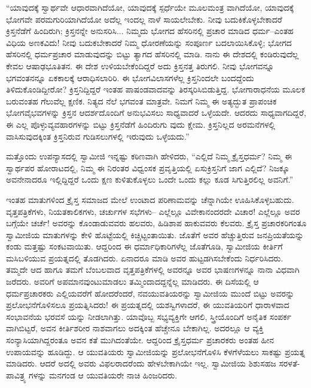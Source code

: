 “ಯಾವುದಕ್ಕೆ ಸ್ವಾರ್ಥವೇ ಆಧಾರವಾಗಿದೆಯೋ, ಯಾವುದಕ್ಕೆ ಸ್ಪರ್ಧೆಯೇ ಮೂಲಮಂತ್ರ ವಾಗಿದೆಯೋ, ಯಾವುದಕ್ಕೆ ಭೋಗವೇ ಪರಮಗುರಿಯಾಗಿದೆಯೋ ಅದೆಲ್ಲ ಇಂದಲ್ಲ ನಾಳೆ ಸಾಯಲೇಬೇಕು. ನೀವು ಬದುಕಿಕೊಳ್ಳಬೇಕಾದರೆ ಕ್ರಿಸ್ತನೆಡೆಗೆ ಹಿಂದಿರುಗಿ; ಕ್ರಿಸ್ತನನ್ನೇ ಅನುಸರಿಸಿ... ನಿಮ್ಮದು ಭೋಗದ ಹೆಸರಿನಲ್ಲಿ ಪ್ರಚಾರ ಮಾಡಿದ ಧರ್ಮ–ಎಂತಹ ವಿಧಿಯ ಅಣಕವಿದು! ನೀವು ಬದುಕಬೇಕಾದರೆ ನಿಮ್ಮ ಧೋರಣೆಯನ್ನು ಸಂಪೂರ್ಣ ಬದಲಾಯಿಸಿಕೊಳ್ಳಿ; ಭೋಗದ ಹೆಸರಿನಲ್ಲಿ ಧರ್ಮಪ್ರಚಾರ ಮಾಡುವುದನ್ನು ಬಿಟ್ಟು ತ್ಯಾಗದ ಹೆಸರಿನಲ್ಲಿ ಮಾಡಿ. ನಾನು ಈ ದೇಶದಲ್ಲಿ ಕಂಡಿರುವುದೆಲ್ಲ ಕೇವಲ ಆಷಾಢಭೂತಿತನ. ಈ ದೇಶ ಉಳಿಯಬೇಕೆಂದಿದ್ದರೆ ಅದು ಕ್ರಿಸ್ತನತ್ತ ತಿರುಗಲಿ. ನೀವು ಭೋಗವನ್ನೂ ಭಗವಂತನನ್ನೂ ಏಕಕಾಲಕ್ಕೆ ಆರಾಧಿಸಲಾರಿರಿ. ಈ ಭೋಗವಿಲಾಸಗಳೆಲ್ಲ ಕ್ರಿಸ್ತನಿಂದಲೇ ಬಂದದ್ದೆಂದು ತಿಳಿದುಕೊಂಡಿದ್ದೀರೋ? ಕ್ರಿಸ್ತನಿದ್ದಿದ್ದರೆ ಇಂತಹ ಪಾಷಂಡವಾದವನ್ನು ತಿರಸ್ಕರಿಸಿಬಿಡುತ್ತಿದ್ದ. ಭೋಗಾರಾಧನೆಯ ಮೂಲಕ ಬರುವಂತಹ ಗೆಲುವೆಲ್ಲ ಕ್ಷಣಿಕ. ನಿತ್ಯದ ನೆಲೆ ಭಗವಂತ ಮಾತ್ರವೇ. ನಿಮಗೆ ನಿಮ್ಮ ಈ ಅತ್ಯದ್ಭುತ ಪ್ರಾಪಂಚಿಕ ಭೋಗವೈಭವಗಳನ್ನು ಕ್ರಿಸ್ತನ ಆದರ್ಶದೊಂದಿಗೆ ಅನುಭವಿಸಲು ಸಾಧ್ಯವಾದರೆ ಒಳ್ಳೆಯದೇ. ಆದರದು ಸಾಧ್ಯವಾಗದಿದ್ದರೆ, ಈ ಎಲ್ಲ ಪೊಳ್ಳುವ್ಯವಹಾರಗಳನ್ನು ಬಿಟ್ಟು ಕ್ರಿಸ್ತನೆಡೆಗೆ ಹಿಂದಿರುಗು ವುದು ಕ್ಷೇಮ. ಕ್ರಿಸ್ತನಿಲ್ಲದ ಅರಮನೆಗಳಲ್ಲಿ ವಾಸಿಸುವುದಕ್ಕಿಂತ ಕ್ರಿಸ್ತನಿರುವ ಗುಡಿಸಲುಗಳಲ್ಲಿ ಇರುವುದು ಒಳ್ಳೆಯದು.”

ಮತ್ತೊಂದು ಉಪನ್ಯಾಸದಲ್ಲಿ ಸ್ವಾಮೀಜಿ ಇನ್ನಷ್ಟು ಕಠಿಣವಾಗಿ ಹೇಳಿದರು, “ಎಲ್ಲಿದೆ ನಿಮ್ಮ ಕ್ರೈಸ್ತಧರ್ಮ? ನಿಮ್ಮ ಈ ಸ್ವಾರ್ಥಪರ ಹೋರಾಟದಲ್ಲಿ, ನಿಮ್ಮ ಈ ನಿರಂತರ ವಿಧ್ವಂಸಕ ಪ್ರವೃತ್ತಿಯಲ್ಲಿ ಏಸುಕ್ರಿಸ್ತನಿಗೆ ಜಾಗ ಎಲ್ಲಿದೆ? ನಿಜಕ್ಕೂ ಅವನೇನಾದರೂ ಇಲ್ಲಿದ್ದಿದ್ದರೆ ಒಂದು ಕ್ಷಣ ಕುಳಿತುಕೊಳ್ಳಲು ಒಂದೇ ಒಂದು ಕಲ್ಲು ಕೂಡ ಸಿಗುತ್ತಿರಲಿಲ್ಲ ಅವನಿಗೆ.”

ಇಂತಹ ಮಾತುಗಳಿಂದ ಕ್ರೈಸ್ತ ಸಮಾಜದ ಮೇಲೆ ಉಂಟಾದ ಪರಿಣಾಮವನ್ನು ಚೆನ್ನಾಗಿಯೇ ಊಹಿಸಿಕೊಳ್ಳಬಹುದು. ವೃತ್ತಪತ್ರಿಕೆಗಳು, ನಿಯತಕಾಲಿಕಗಳು, ಚರ್ಚುಗಳ ಸಭೆಗಳು– ಎಲ್ಲೆಲ್ಲೂ ವಿವೇಕಾನಂದರದೇ ವಿಚಾರ! ಎಲ್ಲೆಲ್ಲೂ ಅವರ ಬಗ್ಗೆಯೇ ಚರ್ಚೆ! ಅವರನ್ನು ಕೊಂಡಾಡುವವರು ಹಲವರು, ಹಿಡಿಶಾಪ ಹಾಕುವವರು ಕೆಲವರು. ಕ್ರೈಸ್ತ ಪ್ರಚಾರಕರಿಗಂತೂ ಸ್ವಾಮೀಜಿಯ ಮಾತುಗಳನ್ನು ಕೇಳಿ ಹೊಟ್ಟೆಯಲ್ಲಿ ಕಿಚ್ಚಿಟ್ಟಂತಾಯಿತು. ಜೊತೆಗೆ ಅವರ ಹೆಚ್ಚುತ್ತಿರುವ ಜನಪ್ರಿಯತೆಯನ್ನು ಕಂಡು ಮತ್ತಷ್ಟು ಸಂಕಟವಾಯಿತು. ಆದ್ದರಿಂದ ಈ ಧರ್ಮಾಧಿಕಾರಿಗಳೆಲ್ಲ ಜೊತೆಗೂಡಿ, ಸ್ವಾಮೀಜಿಯ ಕೀರ್ತಿಗೆ ಮಸಿಬಳಿಯುವ ಪ್ರಯತ್ನದಲ್ಲಿ ತೊಡಗಿದರು. ಏನಾದರೂ ಮಾಡಿ ಅವರ ಹುಟ್ಟಡಗಿಸಬೇಕೆಂದು ನಿರ್ಧರಿಸಿದರು. ತಮ್ಮದೇ ಆದ ಹಾಗೂ ತಮಗೆ ಬೆಂಬಲವಾದ ವೃತ್ತಪತ್ರಿಕೆಗಳಲ್ಲಿ ಅವರನ್ನೂ ಅವರ ಭಾಷಣಗಳನ್ನೂ ನಾನಾ ವಿಧವಾಗಿ ಜರೆದರು. ಅವರಿಗೆ ಅಪಮಾನವುಂಟುಮಾಡಲು ತಮ್ಮಿಂದಾದದ್ದನ್ನೆಲ್ಲ ಮಾಡಿದರು. ಈ ದಿಸೆಯಲ್ಲಿ ಆ ಧರ್ಮಪ್ರಚಾರಕರು ಎಲ್ಲಿಯವರೆಗೆ ಹೋದರೆಂದರೆ, ನವಯುವತಿಯರನ್ನು ಸ್ವಾಮೀಜಿಯ ಮುಂದೆ ಬಿಟ್ಟು ಅವರನ್ನು ಪ್ರಲೋಭನೆಗೊಳಿಸಲೂ ಪ್ರಯತ್ನಿಸಿದರು! ಈ ಪ್ರಯತ್ನದಲ್ಲಿ ಯಶಸ್ವಿಗಳಾದರೆ, ಈ ಯುವತಿಯರಿಗೆ ಧಾರಾಳವಾದ ಸಂಭಾವನೆಯ ಭರವಸೆ ಯನ್ನು ನೀಡಲಾಗಿತ್ತು. ಯಾವೊಬ್ಬ ಸಭ್ಯವ್ಯಕ್ತಿಗೇ ಆಗಲಿ, ಸ್ತ್ರೀಯೊಂದಿಗೆ ಅನೈತಿಕ ಸಂಪರ್ಕ ವಾಗಿಬಿಟ್ಟರೆ, ಅವನ ಕೀರ್ತಿಶರೀರ ನಾಶವಾಗಲು ಅದಕ್ಕಿಂತ ಹೆಚ್ಚೇನೂ ಬೇಕಾಗಿಲ್ಲ. ಅದರಲ್ಲೂ ಆ ವ್ಯಕ್ತಿ ಸಂನ್ಯಾಸಿಯಾಗಿದ್ದರಂತೂ ಅವನ ಕತೆ ಮುಗಿದಂತೆಯೇ. ಆದ್ದರಿಂದ ಕ್ರೈಸ್ತಧರ್ಮ ಪ್ರಚಾರಕರು ಅಂತಹ ಹೀನ ಉಪಾಯವನ್ನು ಹೂಡಿದ್ದು. ಆ ಯುವತಿಯರು ಸ್ವಾಮೀಜಿಯನ್ನು ಪ್ರಲೋಭನೆಗೊಳಿಸಿ ಕೆಳಗೆಳೆಯಲು ಸಾಕಷ್ಟು ಪ್ರಯತ್ನ ಮಾಡಿದರು. ಆದರೆ ಅದಲ್ಲಿ ಅವರು ವಿಫಲರಾದರೆಂದು ಹೇಳಬೇಕಾಗಿಯೇ ಇಲ್ಲ. ಸ್ವಾಮೀಜಿಯ ಶಿಶುಸಹಜ ಸರಳತೆ-ಪಾವಿತ್ರ್ಯ ಗಳನ್ನು ಮನಗಂಡ ಆ ಯುವತಿಯರೇ ನಾಚಿ ಹಿಂಜರಿದರು.

